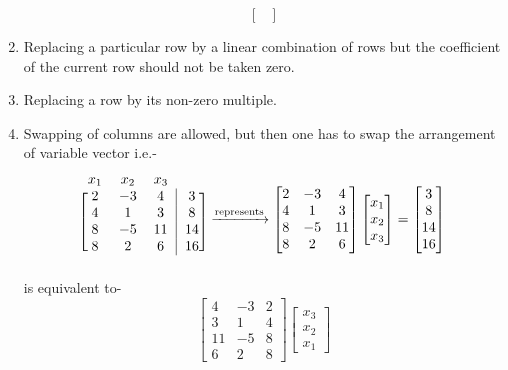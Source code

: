 \documentclass{article}
\begin{document}
\begin{enumerate}
\[\begin{bmatrix}
        \end{bmatrix}
    \]
    \item Replacing a particular row by a linear combination of rows but the coefficient of the current row should not be taken zero.
    \item Replacing a row by its non-zero multiple.
    \item Swapping of columns are allowed, but then one has to swap the arrangement of variable vector i.e.-
      \[
        \begin{blockarray}{cccc}
        x_1 & x_2 & x_3 && \\
        \begin{block}{[ccc|c]}
        2 & -3 & 4 & 3 \\
        4 & 1 & 3 & 8 \\
        8 & -5 & 11 & 14\\
        8 & 2 & 6 & 16 \\
        \end{block}
        \end{blockarray}
            \xrightarrow{\text{represents}}
               \begin{bmatrix}
                   2 & -3 & 4\\
                   4 & 1 & 3\\
                   8 & -5 & 11\\
                   8 & 2 & 6
               \end{bmatrix}
                    \begin{bmatrix}
                        x_1\\x_2\\x_3
                    \end{bmatrix} = 
                        \begin{bmatrix}
                            3\\8\\14\\16
                        \end{bmatrix}\\
            \]
    is equivalent to-
    \[       
        \begin{bmatrix}
        4 & -3 & 2\\
        3 & 1 & 4\\
        11 & -5 & 8\\
        6 & 2 & 8
    \end{bmatrix}
        \begin{bmatrix}
            x_3\\x_2\\x_1

\end{bmatrix}\]
\end{enumerate}
\end{document}
